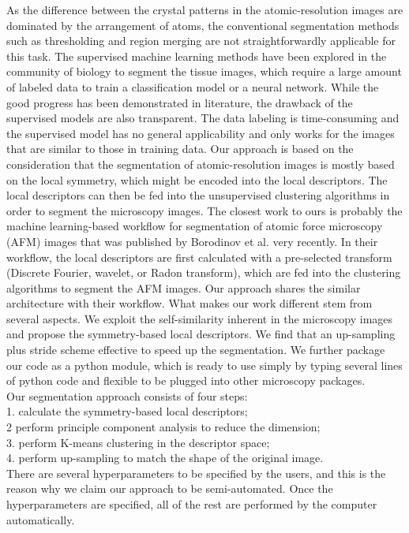 \documentclass[twocolumn,amsmath, floatfix]{revtex4}
\begin{document}
As the difference between the crystal patterns in the atomic-resolution images are dominated by the arrangement of atoms, the conventional segmentation methods such as thresholding \cite{Sadowski2006, Mancas2005} and region merging \cite{Navlakha2013,Nock2004} are not straightforwardly applicable for this task.  The supervised machine learning methods \cite{Ignacio2017, Dang2019} have been explored in the community of biology to segment the tissue images, which require a large amount of labeled data to train a classification model or a neural network. While the good progress has been demonstrated in literature, the drawback of the supervised models are also transparent. The data labeling is time-consuming and the supervised model has no general applicability and only works for the images that are similar to those in training data. Our approach is based on the consideration that the segmentation of atomic-resolution images is mostly based on the local symmetry, which might be encoded into the local descriptors. The local descriptors can then be fed into the unsupervised clustering algorithms in order to segment the microscopy images. The closest work to ours is probably the machine learning-based workflow for segmentation of atomic force microscopy (AFM) images that was published by Borodinov et al.\cite{Borodinov2020} very recently.  In their workflow, the local descriptors are first calculated with a pre-selected transform (Discrete Fourier, wavelet, or Radon transform), which are fed into the clustering algorithms to segment the AFM images.
Our approach shares the similar architecture with their workflow. 
What makes our work different stem from several aspects. We exploit the self-similarity inherent in the microscopy images and propose the symmetry-based local descriptors. We find that an up-sampling plus stride scheme effective to speed up the segmentation. We further package our code as a python module, which is ready to use simply by typing several lines of python code and flexible to be plugged into other microscopy packages.   \\
Our segmentation approach consists of four steps:\\
1. calculate the symmetry-based local descriptors;\\
2 perform principle component analysis to reduce the dimension;\\
3. perform K-means clustering in the descriptor space;\\
4. perform up-sampling to match the shape of the original image.\\
There are several hyperparameters to be specified by the users, and this is the reason why we claim our approach to be semi-automated. Once the hyperparameters are specified, all of the rest are performed by the computer automatically. 
\end{document}
